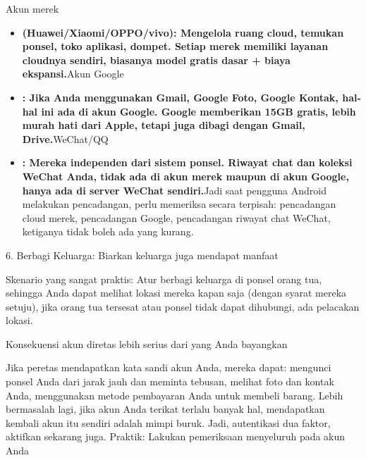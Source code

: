 
Akun merek

\begin{itemize}
  \item \textbf{(Huawei/Xiaomi/OPPO/vivo): Mengelola ruang cloud, temukan ponsel, toko aplikasi, dompet. Setiap merek memiliki layanan cloudnya sendiri, biasanya model gratis dasar + biaya ekspansi.}Akun Google
  \item \textbf{: Jika Anda menggunakan Gmail, Google Foto, Google Kontak, hal-hal ini ada di akun Google. Google memberikan 15GB gratis, lebih murah hati dari Apple, tetapi juga dibagi dengan Gmail, Drive.}WeChat/QQ
  \item \textbf{: Mereka independen dari sistem ponsel. Riwayat chat dan koleksi WeChat Anda, tidak ada di akun merek maupun di akun Google, hanya ada di server WeChat sendiri.}Jadi saat pengguna Android melakukan pencadangan, perlu memeriksa secara terpisah: pencadangan cloud merek, pencadangan Google, pencadangan riwayat chat WeChat, ketiganya tidak boleh ada yang kurang.
\end{itemize}

6. Berbagi Keluarga: Biarkan keluarga juga mendapat manfaat


Skenario yang sangat praktis: Atur berbagi keluarga di ponsel orang tua, sehingga Anda dapat melihat lokasi mereka kapan saja (dengan syarat mereka setuju), jika orang tua tersesat atau ponsel tidak dapat dihubungi, ada pelacakan lokasi.

Konsekuensi akun diretas lebih serius dari yang Anda bayangkan

\begin{tcbwarn}{Jika peretas mendapatkan kata sandi akun Anda, mereka dapat: mengunci ponsel Anda dari jarak jauh dan meminta tebusan, melihat foto dan kontak Anda, menggunakan metode pembayaran Anda untuk membeli barang. Lebih bermasalah lagi, jika akun Anda terikat terlalu banyak hal, mendapatkan kembali akun itu sendiri adalah mimpi buruk. Jadi, autentikasi dua faktor, aktifkan sekarang juga.}
Praktik: Lakukan pemeriksaan menyeluruh pada akun Anda

\end{tcbwarn}

